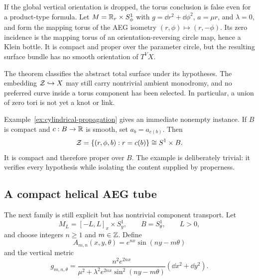 \begin{remark}
If the global vertical orientation is dropped, the torus conclusion is false even
for a product-type formula.  Let $M=\mathbb{R}_r\times S^1_\phi$ with
$g=\dd r^2+\dd\phi^2$, $a=\mu r$, and $\lambda=0$, and form the mapping torus of
the AEG isometry $(r,\phi)\mapsto(r,-\phi)$.  Its zero incidence is the mapping
torus of an orientation-reversing circle map, hence a Klein bottle.  It is compact
and proper over the parameter circle, but the resulting surface bundle has no
smooth orientation of $T^VX$.
\end{remark}

\begin{remark}
The theorem classifies the abstract total surface under its hypotheses.  The
embedding $\mathcal Z\hookrightarrow X$ may still carry nontrivial ambient monodromy,
and no preferred curve inside a torus component has been selected.  In particular,
a union of zero tori is not yet a knot or link.
\end{remark}

Example~\ref{ex:cylindrical-propagation} gives an immediate nonempty instance.  If
$B$ is compact and $c:B\to\mathbb{R}$ is smooth, set $a_b=a_{c(b)}$.  Then
\[
 \mathcal Z=\{(r,\phi,b):r=c(b)\}\cong S^1\times B.
\]
It is compact and therefore proper over $B$.  The example is deliberately trivial:
it verifies every hypothesis while isolating the content supplied by properness.

\subsection{A compact helical AEG tube}

The next family is still explicit but has nontrivial component transport.  Let
\[
 M_L=[-L,L]_x\times S^1_y,
 \qquad B=S^1_\theta,
 \qquad L>0,
\]
and choose integers $n\ge1$ and $m\in\mathbb{Z}$.  Define
\begin{equation}
 A_{m,n}(x,y,\theta)=e^{nx}\sin(ny-m\theta)
 \label{eq:helical-assignment}
\end{equation}
and the vertical metric
\begin{equation}
 g_{m,n,\theta}=
 \frac{n^2e^{2nx}}
 {\mu^2+\lambda^2e^{2nx}\sin^2(ny-m\theta)}
 (\dd x^2+\dd y^2).
 \label{eq:helical-metric}
\end{equation}

